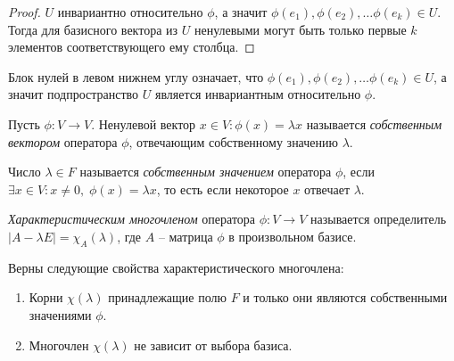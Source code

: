 \begin{proof}
    $U$ инвариантно относительно $\phi$, а значит $\phi(e_1), \phi(e_2), \dots \phi(e_k) \in U$.
    Тогда для базисного вектора из $U$ ненулевыми могут быть только первые $k$ элементов 
    соответствующего ему столбца.
\end{proof}

\begin{note}
    Блок нулей в левом нижнем углу означает, что $\phi(e_1), \phi(e_2), \dots \phi(e_k) \in U$, 
    а значит подпространство $U$ является инвариантным относительно $\phi$.
\end{note}

\begin{definition}
    Пусть $\phi: V \to V$. Ненулевой вектор
    $x \in V: \phi(x) = \lambda x$ называется \textit{собственным вектором} оператора $\phi$, 
    отвечающим собственному значению $\lambda$.
\end{definition}

\begin{definition}
    Число $\lambda \in F$ называется \textit{собственным значением} оператора $\phi$, если 
    $\exists x \in V: x \neq 0,\; \phi(x) = \lambda x$,
    то есть если некоторое $x$ отвечает $\lambda$.
\end{definition}

\begin{definition}
    \textit{Характеристическим многочленом} оператора $\phi: V \to V$ называется определитель $|A - \lambda E| = \chi_A(\lambda)$, где $A$ -- матрица $\phi$ в произвольном базисе.
\end{definition}

\begin{theorem}
    Верны следующие свойства характеристического многочлена:
    \begin{enumerate}
        \item Корни $\chi(\lambda)$ принадлежащие полю $F$ и только они являются собственными 
        значениями $\phi$.
        \item Многочлен $\chi(\lambda)$ не зависит от выбора базиса.
    \end{enumerate} 
\end{theorem}


